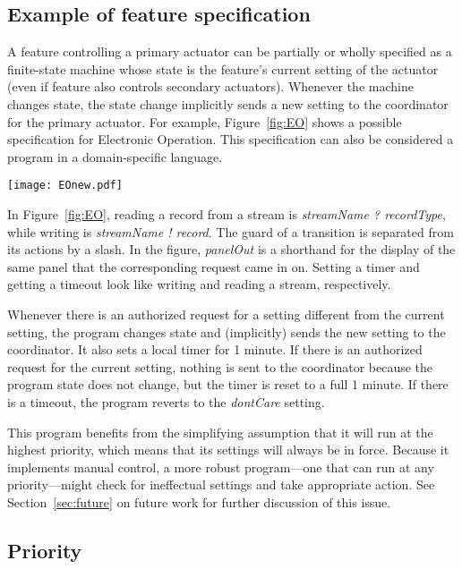 \documentclass[conference]{IEEEtran}
\begin{document}
\subsection{Example of feature specification}

A feature controlling a primary actuator
can be partially or wholly specified as a finite-state
machine whose state is the feature's current setting of the actuator
(even if feature also controls secondary actuators).
Whenever the machine changes state, the state change
implicitly sends a new setting to the
coordinator for the primary actuator.
For example, Figure~\ref{fig:EO} shows a possible specification
for Electronic Operation.
This specification can also be considered a program in a
domain-specific language.

\begin{figure*}
\centering
\texttt{[image: EOnew.pdf]}
\caption{Program for the Electronic Operation feature.}
\label{fig:EO}
\end{figure*}

In Figure~\ref{fig:EO}, 
reading a record from a stream is {\it streamName ? recordType},
while writing is {\it streamName ! record}.
The guard of a transition is separated from its actions by a slash.
In the figure, {\it panelOut} is a shorthand for the display of the same
panel that the corresponding request came in on.
Setting a timer and getting a timeout look like writing and reading
a stream, respectively.

Whenever there is an authorized request for a setting different from
the current setting,
the program changes state and (implicitly) sends the new setting to the
coordinator.
It also sets a local timer for 1 minute.
If there is an authorized request for the current setting, nothing is
sent to the coordinator because the program state does not change, 
but the timer is reset to a full 1 minute.
If there is a timeout, the program reverts to the
{\it dontCare} setting.

This program benefits from the simplifying assumption that it will run
at the highest priority, which means that its settings will always be
in force.
Because it implements manual control, a more robust program---one that
can run at any priority---might
check for ineffectual settings and take appropriate action.
See Section~\ref{sec:future} on future work
for further discussion of this issue.

\subsection{Priority}
\label{sec:prio}
\end{document}

